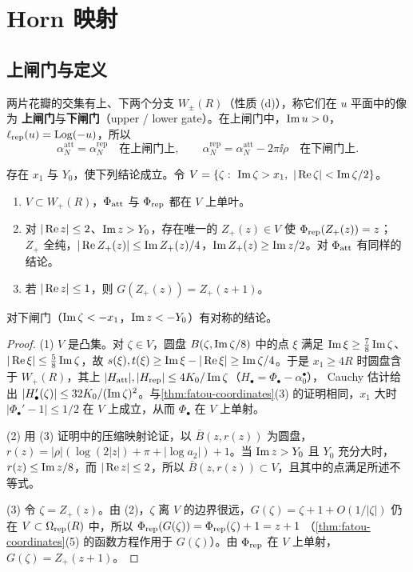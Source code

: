 \section{Horn 映射}\label{ch3:sec:horn}

\subsection{上闸门与定义}
两片花瓣的交集有上、下两个分支 $W_\pm(R)$（性质 (d)），称它们在 $u$ 平面中的像为
\textbf{上闸门}与\textbf{下闸门}（upper / lower gate）。在上闸门中，$\operatorname{Im} u>0$，
$\ell_{\mathrm{rep}}(u)=\operatorname{Log}(-u)$，所以
\begin{equation}\label{ch3:eq:same-alpha}
 \alpha_N^{\mathrm{att}}=\alpha_N^{\mathrm{rep}}\quad\text{在上闸门上},\qquad
 \alpha_N^{\mathrm{rep}}=\alpha_N^{\mathrm{att}}-2\pi\ii\rho\quad\text{在下闸门上}.
\end{equation}

\begin{lemma}[闸门中的反演]\label{ch3:lem:gate}
存在 $x_1$ 与 $Y_0$，使下列结论成立。令 $V=\{\zeta:\ \Ima\zeta>x_1,\ |\Rea\zeta|<\Ima\zeta/2\}$。
\begin{enumerate}
\item $V\subset W_+(R)$，$\Phi_{\mathrm{att}}$ 与 $\Phi_{\mathrm{rep}}$ 都在 $V$ 上单叶。
\item 对 $|\operatorname{Re} z|\le2$、$\operatorname{Im} z>Y_0$，存在唯一的 $Z_+(z)\in V$ 使 $\Phi_{\mathrm{rep}}(Z_+(z))=z$；
 $Z_+$ 全纯，$|\operatorname{Re} Z_+(z)|\le\operatorname{Im} Z_+(z)/4$，$\operatorname{Im} Z_+(z)\ge\operatorname{Im} z/2$。对 $\Phi_{\mathrm{att}}$
 有同样的结论。
\item 若 $|\operatorname{Re} z|\le1$，则 $G(Z_+(z))=Z_+(z+1)$。
\end{enumerate}
对下闸门（$\operatorname{Im}\zeta<-x_1$，$\operatorname{Im} z<-Y_0$）有对称的结论。
\end{lemma}

\begin{proof}
(1) $V$ 是凸集。对 $\zeta\in V$，圆盘 $B(\zeta,\operatorname{Im}\zeta/8)$ 中的点 $\xi$ 满足
$\operatorname{Im}\xi\ge\tfrac78\operatorname{Im}\zeta$、$|\operatorname{Re}\xi|\le\tfrac58\operatorname{Im}\zeta$，故
$s(\xi),t(\xi)\ge\operatorname{Im}\xi-|\operatorname{Re}\xi|\ge\operatorname{Im}\zeta/4$。于是 $x_1\ge4R$ 时圆盘含于
$W_+(R)$，其上 $|H_{\mathrm{att}}|,|H_{\mathrm{rep}}|\le4K_0/\operatorname{Im}\zeta$（$H_\bullet=\Phi_\bullet-\alpha_0^\bullet$），
Cauchy 估计给出 $|H_\bullet'(\zeta)|\le32K_0/(\operatorname{Im}\zeta)^2$。与\cref{thm:fatou-coordinates}(3)
的证明相同，$x_1$ 大时 $|\Phi_\bullet'-1|\le1/2$ 在 $V$ 上成立，从而 $\Phi_\bullet$ 在 $V$ 上单射。

(2) 用 (3) 证明中的压缩映射论证，以 $\bar B(z,r(z))$ 为圆盘，
$r(z)=|\rho|(\log(2|z|)+\pi+|\log a_2|)+1$。当 $\operatorname{Im} z>Y_0$ 且 $Y_0$ 充分大时，
$r(z)\le\operatorname{Im} z/8$，而 $|\operatorname{Re} z|\le2$，所以 $\bar B(z,r(z))\subset V$，且其中的点满足所述不等式。

(3) 令 $\zeta=Z_+(z)$。由 (2)，$\zeta$ 离 $V$ 的边界很远，$G(\zeta)=\zeta+1+O(1/|\zeta|)$ 仍在
$V\subset\Omega_{\mathrm{rep}}(R)$ 中，所以 $\Phi_{\mathrm{rep}}(G(\zeta))=\Phi_{\mathrm{rep}}(\zeta)+1=z+1$
（\cref{thm:fatou-coordinates}(5) 的函数方程作用于 $G(\zeta)$）。由 $\Phi_{\mathrm{rep}}$ 在 $V$ 上单射，
$G(\zeta)=Z_+(z+1)$。
\end{proof}

